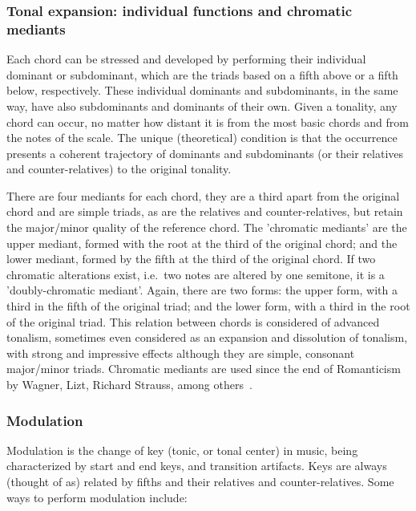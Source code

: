 \subsubsection{Tonal expansion: individual functions and chromatic mediants}
Each chord can be stressed and developed by performing their individual dominant or subdominant, which are the triads based
on a fifth above or a fifth below, respectively. These individual dominants and subdominants,
in the same way, have also subdominants and dominants of their own. Given a tonality, any chord can occur, no matter
how distant it is from the most basic chords and from the notes of the scale.
The unique (theoretical) condition is that the occurrence presents a coherent trajectory of dominants and subdominants (or their relatives and counter-relatives) to the original tonality.

There are four mediants for each chord,
they are a third apart from the original chord and are simple triads,
as are the relatives and counter-relatives,
but retain the major/minor quality of the reference chord.
The
'chromatic mediants'
are the upper mediant, formed with the root at the third of the original chord;
and the lower mediant, formed by the fifth at the third of the original chord.
If two chromatic alterations exist, i.e.\ two notes are altered by one semitone,
it is a 'doubly-chromatic mediant'.
Again, there are two forms: 
the upper form, with a third in the fifth of the original triad; and the lower form, with a third in the root
of the original triad.
This relation between chords is considered of advanced tonalism, sometimes even considered as an expansion and dissolution of tonalism,
with strong and impressive effects although they are simple, consonant major/minor triads.
Chromatic mediants are used since the end of Romanticism by Wagner, Lizt, Richard Strauss, among others~\cite{Harmonia,Salzer}. 


\subsubsection{Modulation}
Modulation is the change of key (tonic, or tonal center) in music, being characterized by start and end keys, and transition artifacts.
Keys are always (thought of as) related by fifths and their relatives and counter-relatives. Some ways to perform modulation include:

